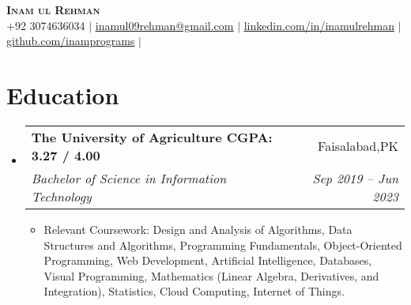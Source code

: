 \documentclass[letterpaper,11pt]{article}
\makeatletter
\newcommand{\resumeItem}[1]{
  \item\small{
    {#1 \vspace{-2pt}}
  }
}
\newcommand{\resumeSubheading}[4]{
  \vspace{-2pt}\item
    \begin{tabular*}{0.97\textwidth}[t]{l@{\extracolsep{\fill}}r}
      \textbf{#1} & #2 \\
      \textit{\small#3} & \textit{\small #4} \\
    \end{tabular*}\vspace{-7pt}
}
\newcommand{\resumeSubHeadingListStart}{\begin{itemize}[leftmargin=0.15in, label={}]}
\newcommand{\resumeSubHeadingListEnd}{\end{itemize}}
\newcommand{\resumeItemListStart}{\begin{itemize}}
\newcommand{\resumeItemListEnd}{\end{itemize}\vspace{-5pt}}
\makeatother
\begin{document}

\begin{center}
  \textbf{\Huge \scshape Inam ul Rehman } \\ \vspace{1pt}
  \small +92 3074636034 $|$
  \href{mailto:inamul09rehman@gmail.com}{\underline{inamul09rehman@gmail.com}} $|$
  \href{https://www.linkedin.com/in/inamulrehman/}{\underline{linkedin.com/in/inamulrehman}} $|$
  \href{https://github.com/inamprograms}{\underline{github.com/inamprograms}} $|$
\end{center}

\section{Education}
\resumeSubHeadingListStart
\resumeSubheading
{The University of Agriculture \hspace{3.5cm} CGPA: 3.27 / 4.00}{Faisalabad,PK}
{Bachelor of Science in Information Technology}{Sep 2019 -- Jun 2023}
\resumeItemListStart
\resumeItem{Relevant Coursework: Design and Analysis of Algorithms, Data Structures and Algorithms, Programming Fundamentals, Object-Oriented Programming, Web Development, Artificial Intelligence, Databases, Visual Programming, Mathematics (Linear Algebra, Derivatives, and Integration), Statistics, Cloud Computing, Internet of Things.}
\resumeItemListEnd
\resumeSubHeadingListEnd
%
\end{document}
